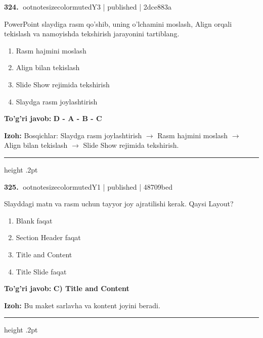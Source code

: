 \documentclass[10pt,a4paper]{article}
\begin{document}
\textbf{\color{ink}324.} {ootnotesizecolor{muted}Y3 | published | 2dce883a}
\par
PowerPoint slaydiga rasm qo'shib, uning o'lchamini moslash, Align orqali tekislash va namoyishda tekshirish jarayonini tartiblang.
\begin{enumerate}[label=\Alph*),leftmargin=9mm]
\item Rasm hajmini moslash
\item Align bilan tekislash
\item Slide Show rejimida tekshirish
\item Slaydga rasm joylashtirish
\end{enumerate}
\begin{tcolorbox}[enhanced,breakable,colback=teal!4,colframe=teal!55!black,boxrule=0.45pt,arc=1.2mm,left=2.8mm,right=2.8mm,top=2mm,bottom=2mm]
\textbf{\color{teal}To'g'ri javob:} \textbf{D - A - B - C}
\par\smallskip
\textbf{Izoh:} Bosqichlar: Slaydga rasm joylashtirish \ensuremath{\rightarrow} Rasm hajmini moslash \ensuremath{\rightarrow} Align bilan tekislash \ensuremath{\rightarrow} Slide Show rejimida tekshirish.
\end{tcolorbox}
\vspace{2mm}\hrule height .2pt\vspace{2mm}

\textbf{\color{ink}325.} {ootnotesizecolor{muted}Y1 | published | 48709bed}
\par
Slayddagi matn va rasm uchun tayyor joy ajratilishi kerak. Qaysi Layout?
\begin{enumerate}[label=\Alph*),leftmargin=9mm]
\item Blank faqat
\item Section Header faqat
\item Title and Content
\item Title Slide faqat
\end{enumerate}
\begin{tcolorbox}[enhanced,breakable,colback=teal!4,colframe=teal!55!black,boxrule=0.45pt,arc=1.2mm,left=2.8mm,right=2.8mm,top=2mm,bottom=2mm]
\textbf{\color{teal}To'g'ri javob:} \textbf{C) Title and Content}
\par\smallskip
\textbf{Izoh:} Bu maket sarlavha va kontent joyini beradi.
\end{tcolorbox}
\vspace{2mm}\hrule height .2pt\vspace{2mm}
\end{document}
